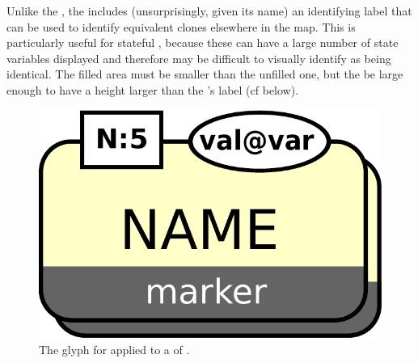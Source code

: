Unlike the , the  includes (unsurprisingly, given its name) an identifying label that can be used to identify equivalent clones elsewhere in the map.  This is particularly useful for stateful , because these can have a large number of state variables displayed and therefore may be difficult to visually identify as being identical. The filled area must be smaller than the unfilled one, but the be large enough to have a height larger than the 's label (cf below).

\begin{figure}[H]
  \centering
  \includegraphics[scale = 0.3]{images/labeledCloneMarker}
  \caption{The \PD glyph for  applied to a  of  .}
  \label{fig:labeledCloneMarker}
\end{figure}

